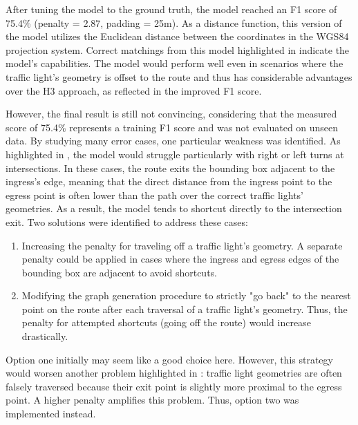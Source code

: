 After tuning the model to the ground truth, the model reached an F1 score of 75.4\% (penalty = 2.87, padding = 25m). As a distance function, this version of the model utilizes the Euclidean distance between the coordinates in the WGS84 projection system. Correct matchings from this model highlighted in  indicate the model's capabilities. The model would perform well even in scenarios where the traffic light's geometry is offset to the route and thus has considerable advantages over the H3 approach, as reflected in the improved F1 score.

However, the final result is still not convincing, considering that the measured score of 75.4\% represents a training F1 score and was not evaluated on unseen data. By studying many error cases, one particular weakness was identified. As highlighted in , the model would struggle particularly with right or left turns at intersections. In these cases, the route exits the bounding box adjacent to the ingress's edge, meaning that the direct distance from the ingress point to the egress point is often lower than the path over the correct traffic lights' geometries. As a result, the model tends to shortcut directly to the intersection exit. Two solutions were identified to address these cases:

\begin{enumerate}
    \item Increasing the penalty for traveling off a traffic light's geometry. A separate penalty could be applied in cases where the ingress and egress edges of the bounding box are adjacent to avoid shortcuts.
    \item  Modifying the graph generation procedure to strictly "go back" to the nearest point on the route after each traversal of a traffic light's geometry. Thus, the penalty for attempted shortcuts (going off the route) would increase drastically.
\end{enumerate}

Option one initially may seem like a good choice here. However, this strategy would worsen another problem highlighted in : traffic light geometries are often falsely traversed because their exit point is slightly more proximal to the egress point. A higher penalty amplifies this problem. Thus, option two was implemented instead. 

